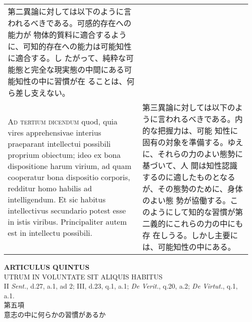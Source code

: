 \documentclass[10pt]{jsarticle} %
\begin{document}
\begin{longtable}{p{21em}p{21em}}
第二異論に対しては以下のように言われるべきである。可感的存在への能力が
物体的質料に適合するように、可知的存在への能力は可能知性に適合する。し
たがって、純粋な可能態と完全な現実態の中間にある可能知性の中に習慣が在
ることは、何ら差し支えない。

\\




{\scshape Ad tertium dicendum} quod, quia vires apprehensivae interius
praeparant intellectui possibili proprium obiectum; ideo ex bona
dispositione harum virium, ad quam cooperatur bona dispositio
corporis, redditur homo habilis ad intelligendum. Et sic habitus
intellectivus secundario potest esse in istis viribus. Principaliter
autem est in intellectu possibili.

&

第三異論に対しては以下のように言われるべきである。内的な把握力は、可能
知性に固有の対象を準備する。ゆえに、それらの力のよい態勢に基づいて、人
間は知性認識するのに適したものとなるが、その態勢のために、身体のよい態
勢が協働する。このようにして知的な習慣が第二義的にこれらの力の中にも存
在しうる。しかし主要には、可能知性の中にある。

\end{longtable}
\newpage


\begin{center}
{\Large {\bf ARTICULUS QUINTUS}}\\
{\large UTRUM IN VOLUNTATE SIT ALIQUIS HABITUS}\\
{\footnotesize II {\itshape Sent.}, d.27, a.1, ad 2; III, d.23, q.1, a.1; {\itshape De Verit.}, q.20, a.2; {\itshape De Virtut.}, q.1, a.1.}\\
{\Large 第五項\\意志の中に何らかの習慣があるか}
\end{center}
\end{document}
